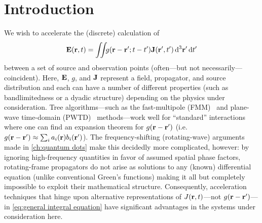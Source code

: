 \section{Introduction}

We wish to accelerate the (discrete) calculation of 
\begin{equation}
  \vb{E}(\vb{r}, t) = \iint_{} g(\vb{r} - \vb{r}'; t - t') \vb{J}(\vb{r}', t') \dd[3]{\vb{r}'} \dd{t'}
  \label{eq:general integral equation}
\end{equation}
between a set of source and observation points (often---but not necessarily---coincident).
Here, $\vb{E}$, $g$, and $\vb{J}$ represent a field, propagator, and source distribution and each can have a number of different properties (such as bandlimitedness or a dyadic structure) depending on the physics under consideration.
Tree algorithms---such as the fast-multipole (FMM)~\cite{Greengard1987} and plane-wave time-domain (PWTD)~\cite{Ergin1999} methods---work well for ``standard'' interactions where one can find an expansion theorem for $g(\vb{r} - \vb{r}')$ (i.e. $g(\vb{r} - \vb{r}') \approx \sum_i a_i(\vb{r}) b_i(\vb{r}')$).
The frequency-shifting (rotating-wave) arguments made in \cref{ch:quantum dots} make this decidedly more complicated, however: by ignoring high-frequency quantities in favor of assumed spatial phase factors, rotating-frame propagators do not arise as solutions to any (known) differential equation (unlike conventional Green's functions) making it all but completely impossible to exploit their mathematical structure.
Consequently, acceleration techniques that hinge upon alternative representations of $J(\vb{r}, t)$---not $g(\vb{r} - \vb{r}')$---in \cref{eq:general integral equation} have significant advantages in the systems under consideration here.

